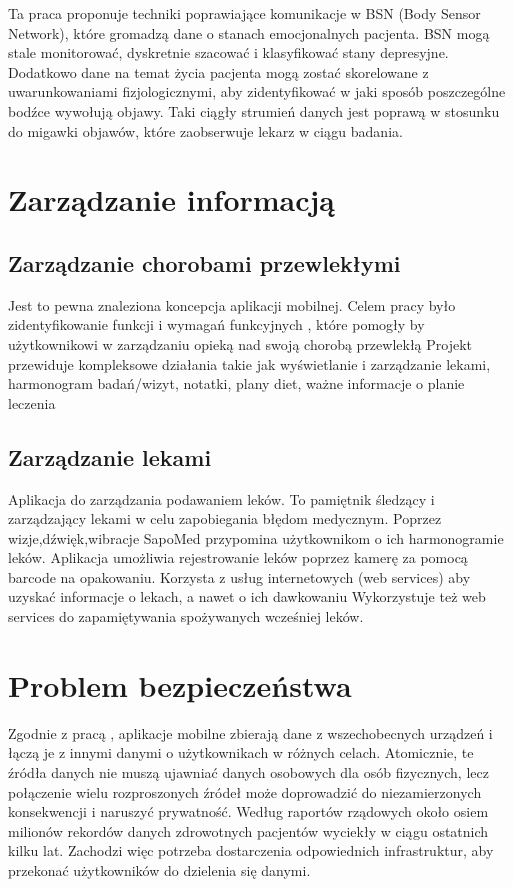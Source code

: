 Ta praca proponuje techniki poprawiające komunikacje w BSN (Body Sensor Network), które gromadzą dane o stanach emocjonalnych pacjenta. BSN  mogą stale monitorować, dyskretnie szacować i klasyfikować stany depresyjne. Dodatkowo dane na temat życia pacjenta mogą zostać skorelowane z uwarunkowaniami fizjologicznymi, aby zidentyfikować w jaki sposób poszczególne bodźce wywołują objawy. Taki ciągły strumień danych jest poprawą w stosunku do migawki objawów, które zaobserwuje lekarz w ciągu badania. 
 


\section{Zarządzanie informacją}
\label{sec:zarzadz_inf}

\subsection{Zarządzanie chorobami przewlekłymi}
Jest to pewna znaleziona koncepcja aplikacji mobilnej. Celem pracy było zidentyfikowanie funkcji i wymagań funkcyjnych , które pomogły by użytkownikowi w zarządzaniu opieką nad swoją chorobą przewlekłą
 Projekt przewiduje kompleksowe działania takie jak wyświetlanie i zarządzanie lekami, harmonogram badań/wizyt, notatki, plany diet, ważne informacje o planie leczenia

\subsection{Zarządzanie lekami}
 Aplikacja do zarządzania podawaniem leków. To pamiętnik śledzący i zarządzający lekami w celu zapobiegania błędom medycznym. 
 Poprzez wizje,dźwięk,wibracje  SapoMed przypomina użytkownikom o ich harmonogramie leków.
 Aplikacja umożliwia rejestrowanie leków poprzez kamerę za pomocą barcode na opakowaniu. 
 Korzysta z usług internetowych (web services) aby uzyskać informacje o lekach, a nawet o ich dawkowaniu
 Wykorzystuje też web services do zapamiętywania spożywanych wcześniej leków.

\section{Problem bezpieczeństwa}
\label{sec:problem_bezp}
Zgodnie z pracą \cite{Ammar2014}, aplikacje mobilne zbierają dane z wszechobecnych urządzeń i łączą je z innymi danymi o użytkownikach w różnych celach. Atomicznie, te źródła danych nie muszą ujawniać danych osobowych dla osób fizycznych, lecz połączenie wielu rozproszonych źródeł może doprowadzić do niezamierzonych konsekwencji i naruszyć prywatność. Według raportów rządowych około osiem milionów rekordów danych zdrowotnych pacjentów wyciekły w ciągu ostatnich kilku lat. Zachodzi więc potrzeba dostarczenia odpowiednich infrastruktur, aby przekonać użytkowników do dzielenia się danymi. 

